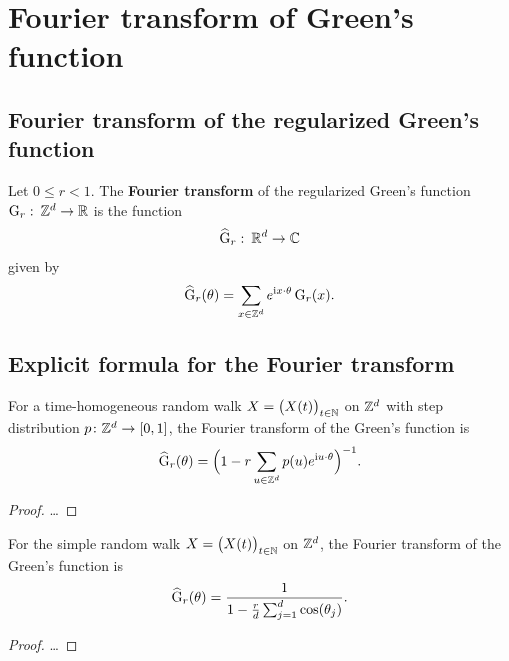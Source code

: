 \chapter{Fourier transform of Green's function}

\section{Fourier transform of the regularized Green's function}

\begin{definition}
  \label{def:Green_Fourier_transf}
  Let $0 \le r < 1$.
  The \textbf{Fourier transform} of the regularized Green's function
  $\mathrm{G}_{r} \, \colon \, \mathbb{Z}^d \to \mathbb{R}$
  is the function
  \begin{align*}
  \widehat{\mathrm{G}}_{r} \, \colon \, \mathbb{R}^d \to \mathbb{C}
  \end{align*}
  given by
  \begin{align*}
  \widehat{\mathrm{G}}_{r} (\theta) = \sum_{x \in \mathbb{Z}^d} e^{\mathrm{i} x \cdot \theta} \, \mathrm{G}_{r}(x) .
  \end{align*}
\end{definition}

\section{Explicit formula for the Fourier transform}

\begin{lemma}
  \label{lem:Markovian_Green_Fourier}
  For a time-homogeneous random walk $X = \big(X(t)\big)_{t \in \mathbb{N}}$ on $\mathbb{Z}^d$
  with step distribution $p \colon \mathbb{Z}^d \to [0,1]$,
  the Fourier transform of the Green's function is
  \begin{align*}
  \widehat{\mathrm{G}}_{r} (\theta) = \Big(1 - r \sum_{u\in \mathbb{Z}^d} p(u) e^{\mathrm{i} u \cdot \theta}\Big)^{-1} .
  \end{align*}
\end{lemma}
\begin{proof}
\ldots
\end{proof}

\begin{lemma}
  \label{lem:SRW_Green_Fourier}
  For the simple random walk $X = \big(X(t)\big)_{t \in \mathbb{N}}$ on $\mathbb{Z}^d$,
  the Fourier transform of the Green's function is
  \begin{align*}
  \widehat{\mathrm{G}}_{r} (\theta) = \frac{1}{1-\frac{r}{d} \sum_{j=1}^d \cos(\theta_j)} .
  \end{align*}
\end{lemma}
\begin{proof}
\ldots
\end{proof}

